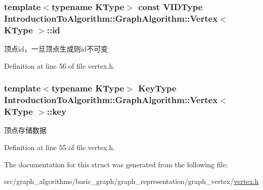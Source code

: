 \subsubsection[{id}]{\setlength{\rightskip}{0pt plus 5cm}template$<$typename K\+Type$>$ const {\bf V\+I\+D\+Type} {\bf Introduction\+To\+Algorithm\+::\+Graph\+Algorithm\+::\+Vertex}$<$ K\+Type $>$\+::id}\label{struct_introduction_to_algorithm_1_1_graph_algorithm_1_1_vertex_a76668b285452856d184a245b7b35b7c1}
顶点id，一旦顶点生成则id不可变 

Definition at line 56 of file vertex.\+h.

\hypertarget{struct_introduction_to_algorithm_1_1_graph_algorithm_1_1_vertex_a5bcfb4e0ba9450b8ebb2543069772d1f}{}
\subsubsection[{key}]{\setlength{\rightskip}{0pt plus 5cm}template$<$typename K\+Type$>$ {\bf Key\+Type} {\bf Introduction\+To\+Algorithm\+::\+Graph\+Algorithm\+::\+Vertex}$<$ K\+Type $>$\+::key}\label{struct_introduction_to_algorithm_1_1_graph_algorithm_1_1_vertex_a5bcfb4e0ba9450b8ebb2543069772d1f}
顶点存储数据 

Definition at line 55 of file vertex.\+h.



The documentation for this struct was generated from the following file\+:\begin{DoxyCompactItemize}
\item 
src/graph\+\_\+algorithms/basic\+\_\+graph/graph\+\_\+representation/graph\+\_\+vertex/\hyperlink{vertex_8h}{vertex.\+h}\end{DoxyCompactItemize}
